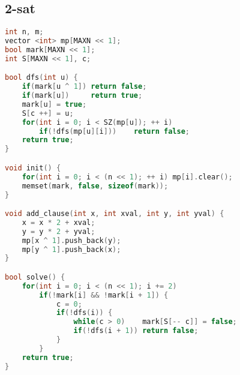 \subsection{2-sat}
    \begin{lstlisting}[language=c++]
int n, m;
vector <int> mp[MAXN << 1];
bool mark[MAXN << 1];
int S[MAXN << 1], c;

bool dfs(int u) {
    if(mark[u ^ 1]) return false;
    if(mark[u])     return true;
    mark[u] = true;
    S[c ++] = u;
    for(int i = 0; i < SZ(mp[u]); ++ i)
        if(!dfs(mp[u][i]))    return false;
    return true;
}

void init() {
    for(int i = 0; i < (n << 1); ++ i) mp[i].clear();
    memset(mark, false, sizeof(mark));
}

void add_clause(int x, int xval, int y, int yval) {
    x = x * 2 + xval;
    y = y * 2 + yval;
    mp[x ^ 1].push_back(y);
    mp[y ^ 1].push_back(x);
}

bool solve() {
    for(int i = 0; i < (n << 1); i += 2) 
        if(!mark[i] && !mark[i + 1]) {
            c = 0;
            if(!dfs(i)) {
                while(c > 0)    mark[S[-- c]] = false;
                if(!dfs(i + 1)) return false;
            }
        }
    return true;
}
    \end{lstlisting}
